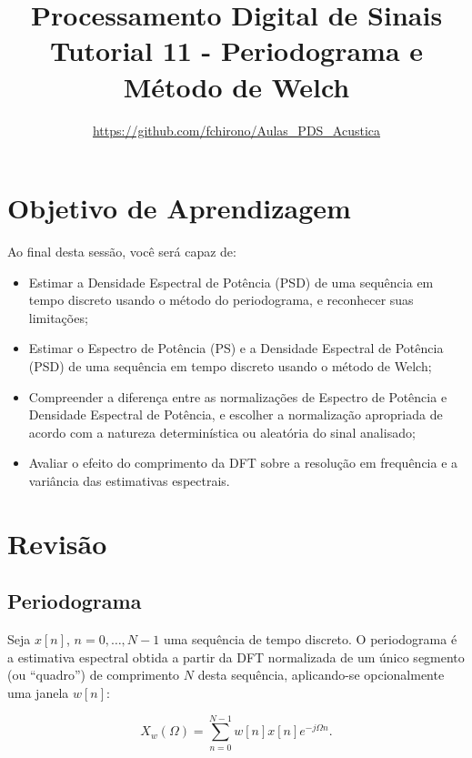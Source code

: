 \documentclass[a4paper,twoside,12pt]{article}
\title{\vspace{-2cm} Processamento Digital de Sinais\\ Tutorial 11 - Periodograma e Método de Welch}
\author{\url{https://github.com/fchirono/Aulas_PDS_Acustica}}
\begin{document}
	\date{}
	\maketitle
	
	\section*{Objetivo de Aprendizagem}
	Ao final desta sessão, você será capaz de:
	\begin{itemize}
		\item Estimar a Densidade Espectral de Potência (PSD) de uma sequência em tempo discreto usando o método do periodograma, e reconhecer suas limitações;
		\item Estimar o Espectro de Potência (PS) e a Densidade Espectral de Potência (PSD) de uma sequência em tempo discreto usando o método de Welch;
		\item Compreender a diferença entre as normalizações de Espectro de Potência e Densidade Espectral de Potência, e escolher a normalização apropriada de acordo com a natureza determinística ou aleatória do sinal analisado;
		\item Avaliar o efeito do comprimento da DFT sobre a resolução em frequência e a variância das estimativas espectrais.
	\end{itemize}
	
	\begingroup
	\let\clearpage\relax
	\tableofcontents
	\endgroup
	
	\section{Revisão}
	\subsection{Periodograma}
	
	Seja $x[n]$, $n = 0, \ldots, N-1$ uma sequência de tempo discreto. O periodograma é a estimativa espectral obtida a partir da DFT normalizada de um único segmento (ou ``quadro'') de comprimento $N$ desta sequência, aplicando-se opcionalmente uma janela $w[n]$:
	
	\begin{equation}
		X_w(\Omega) = \sum_{n=0}^{N-1} w[n] x[n] e^{-j \Omega n}.
	\end{equation}
	
\end{document}
